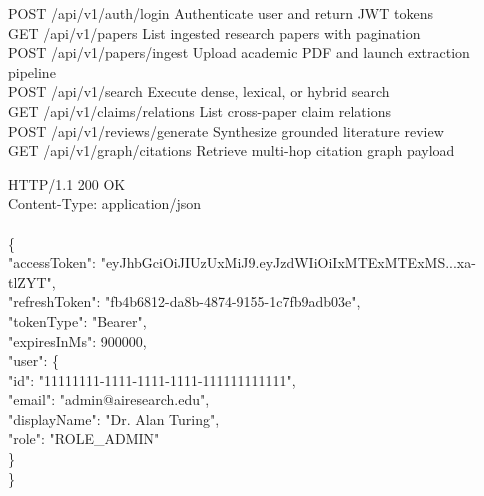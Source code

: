 \documentclass[11pt,a4paper,titlepage]{report}
\begin{document}
\begin{tcolorbox}[colback=white, colframe=primaryTeal, width=\textwidth, arc=3pt, title={Swagger / OpenAPI 3.0 Documentation at /swagger-ui.html}]
\footnotesize\ttfamily
POST   /api/v1/auth/login            Authenticate user and return JWT tokens\\
GET    /api/v1/papers                List ingested research papers with pagination\\
POST   /api/v1/papers/ingest         Upload academic PDF and launch extraction pipeline\\
POST   /api/v1/search                Execute dense, lexical, or hybrid search\\
GET    /api/v1/claims/relations      List cross-paper claim relations\\
POST   /api/v1/reviews/generate      Synthesize grounded literature review\\
GET    /api/v1/graph/citations       Retrieve multi-hop citation graph payload
\end{tcolorbox}
\vspace{-2pt}
\label{fig:swagger_ui}
\vspace{6pt}

\begin{tcolorbox}[colback=white, colframe=primaryTeal, width=\textwidth, arc=3pt, title={HTTP Response: POST /api/v1/auth/login}]
\footnotesize\ttfamily
HTTP/1.1 200 OK\\
Content-Type: application/json\\
\\
\{\\
\quad "accessToken": "eyJhbGciOiJIUzUxMiJ9.eyJzdWIiOiIxMTExMTExMS...xa-tlZYT",\\
\quad "refreshToken": "fb4b6812-da8b-4874-9155-1c7fb9adb03e",\\
\quad "tokenType": "Bearer",\\
\quad "expiresInMs": 900000,\\
\quad "user": \{\\
\quad\quad "id": "11111111-1111-1111-1111-111111111111",\\
\quad\quad "email": "admin@airesearch.edu",\\
\quad\quad "displayName": "Dr. Alan Turing",\\
\quad\quad "role": "ROLE\_ADMIN"\\
\quad \}\\
\}
\end{tcolorbox}
\vspace{-2pt}
\label{fig:login_response}
\vspace{6pt}
\end{document}
